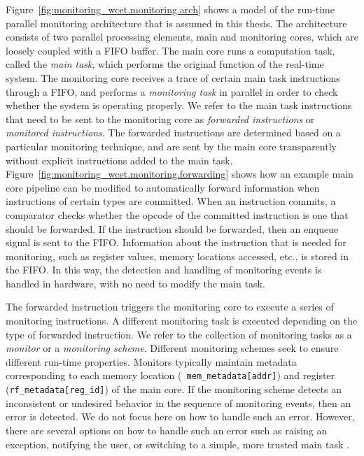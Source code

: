 Figure~\ref{fig:monitoring_wcet.monitoring.arch} shows a model of the
run-time parallel monitoring architecture that is assumed in this thesis. The
architecture consists of two parallel processing elements, main and monitoring
cores, which are loosely coupled with a FIFO buffer.  The main core runs a
computation task, called the {\em main task}, which performs the original
function of the real-time system.  The monitoring core receives a trace of
certain main task instructions through a FIFO, and performs a {\em monitoring
task} in parallel in order to check whether the system is operating properly.
We refer to the main task instructions that need to be sent to the monitoring
core as {\em forwarded instructions} or {\em monitored instructions}. The
forwarded instructions are determined based on a particular monitoring
technique, and are sent by the main core transparently without explicit
instructions added to the main task.
Figure~\ref{fig:monitoring_wcet.monitoring.forwarding} shows how an example
main core pipeline can be modified to automatically forward information when
instructions of certain types are committed. When an instruction commits, a
comparator checks whether the opcode of the committed instruction is one that
should be forwarded. If the instruction should be forwarded, then an enqueue
signal is sent to the FIFO.  Information about the instruction that is needed
for monitoring, such as register values, memory locations accessed, etc., is
stored in the FIFO. In this way, the detection and handling of monitoring
events is handled in hardware, with no need to modify the main task.

The forwarded instruction triggers the monitoring core to execute a series of
monitoring instructions.  A different monitoring task is executed depending on
the type of forwarded instruction. We refer to the collection of monitoring
tasks as a \emph{monitor} or a \emph{monitoring scheme}. Different monitoring
schemes seek to ensure different run-time properties.  Monitors typically
maintain metadata corresponding to each memory location ({\tt
mem\_metadata[addr]}) and register ({\tt rf\_metadata[reg\_id]}) of the main
core.  If the monitoring scheme detects an inconsistent or undesired behavior
in the sequence of monitoring events, then an error is detected. We do not
focus here on how to handle such an error. However, there are several options
on how to handle such an error such as raising an exception, notifying the
user, or switching to a simple, more trusted main task \cite{sha-simplex-sw01}.

